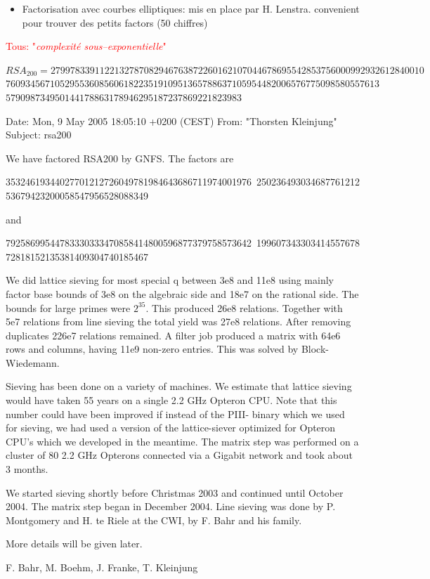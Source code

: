 \documentclass[landscape]{powersem} %
\newcommand{\psd}{\pause}%
\newcommand{\heading}[1]{%
 \begin{center}
  \large\bf
  \Ovalbox{{\textcolor{conceptcolor}{#1}}}%
 \end{center}
 \vspace{1ex minus 1ex}}
\begin{document}
\begin{slide}
\begin{itemize}
\item[\textcolor{blue}{\ding{185}}]
  Factorisation avec  courbes elliptiques: mis en place par  H. Lenstra.
  convenient pour trouver des petits factors (50 chiffres)\psd

\end{itemize}

\centerline{\textcolor{red}{Tous: "\emph{complexit\'e sous--exponentielle}"}}
\end{slide}

\begin{slide}
\heading{La factorisation de $RSA_{200}$}

\begin{tiny}

$RSA_{200}=2799783391122132787082946763872260162107044678695542853756000992932612840010$
          $7609345671052955360856061822351910951365788637105954482006576775098580557613$
          $579098734950144178863178946295187237869221823983$\psd


Date: Mon, 9 May 2005 18:05:10 +0200 (CEST) 
From: "Thorsten Kleinjung"
Subject: rsa200 

We have factored RSA200 by GNFS. The factors are

35324619344027701212726049781984643686711974001976\
25023649303468776121253679423200058547956528088349

and

79258699544783330333470858414800596877379758573642\
19960734330341455767872818152135381409304740185467


We did lattice sieving for most special q between 3e8 and 11e8
using mainly factor base bounds of 3e8 on the algebraic side and 18e7 
on
the rational side. The bounds for large primes were $2^{35}$. This produced
26e8 relations. Together with 5e7 relations from line sieving the total
yield was 27e8 relations. After removing duplicates 226e7 relations
remained. A filter job produced a matrix with 64e6 rows and columns,
having 11e9 non-zero entries. This was solved by Block-Wiedemann.

Sieving has been done on a variety of machines. We estimate that
lattice sieving would have taken 55 years on a single 2.2 GHz Opteron 
CPU.
Note that this number could have been improved if instead of the PIII-
binary which we used for sieving, we had used a version of the
lattice-siever optimized for Opteron CPU's which we developed in the 
meantime.
The matrix step was performed on a cluster of 80 2.2 GHz Opterons 
connected via a Gigabit network and took about 3 months.

We started sieving shortly before Christmas 2003 and continued until
October 2004. The matrix step began in December 2004.
Line sieving was done by P. Montgomery and H. te Riele at the CWI, by
F. Bahr and his family.

More details will be given later.

F. Bahr, M. Boehm, J. Franke, T. Kleinjung
\end{tiny}
\end{slide}
\end{document}
